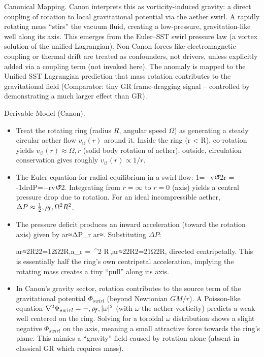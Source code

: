 \documentclass[11pt]{article}
\begin{document}
Canonical Mapping. Canon interprets this as vorticity-induced gravity: a direct coupling of rotation to local gravitational potential via the aether swirl. A rapidly rotating mass “stirs” the vacuum fluid, creating a low-pressure, gravitation-like well along its axis. This emerges from the Euler–SST swirl pressure law (a vortex solution of the unified Lagrangian). Non-Canon forces like electromagnetic coupling or thermal drift are treated as confounders, not drivers, unless explicitly added via a coupling term (not invoked here). The anomaly is mapped to the Unified SST Lagrangian prediction that mass rotation contributes to the gravitational field (Comparator: tiny GR frame-dragging signal – controlled by demonstrating a much larger effect than GR).


Derivable Model (Canon).


\begin{itemize}

\item 
Treat the rotating ring (radius $R$, angular speed $\Omega$) as generating a steady circular aether flow $v_{\circlearrowleft}(r)$ around it. Inside the ring (r < R), co-rotation yields $v_{\circlearrowleft}(r)\approx \Omega,r$ (solid body rotation of aether); outside, circulation conservation gives roughly $v_{\circlearrowleft}(r)\propto 1/r$.




\item 
The Euler equation for radial equilibrium in a swirl flow: 1\rhoFdPdr=−v↺2r = -\rhoF1drdP=−rv↺2. Integrating from $r=\infty$ to $r=0$ (axis) yields a central pressure drop due to rotation. For an ideal incompressible aether, $\Delta P \approx \tfrac{1}{2},\rho_{\!f},\Omega^2 R^2$.




\item 
The pressure deficit produces an inward acceleration (toward the rotation axis) given by ar≈ΔP\rhoFRa_{r} \approx {}ar≈. Substituting $\Delta P$:


ar≈2R22\rhoFR=12Ω2R,a_{r} \;\approx\;  \;=\; \,\Omega^2 R\,,ar≈2\rhoFR{}2R2=21Ω2R,
directed centripetally. This is essentially half the ring’s own centripetal acceleration, implying the rotating mass creates a tiny “pull” along its axis.




\item 
In Canon’s gravity sector, rotation contributes to the source term of the gravitational potential $\Phi_{swirl}$ (beyond Newtonian $GM/r$). A Poisson-like equation $\nabla^2 \Phi_{swirl} = -,\rho_{\!f},|\omega|^2$ (with $\omega$ the aether vorticity) predicts a weak well centered on the ring. Solving for a toroidal $\omega$ distribution shows a slight negative $\Phi_{swirl}$ on the axis, meaning a small attractive force towards the ring’s plane. This mimics a “gravity” field caused by rotation alone (absent in classical GR which requires mass).




\end{itemize}
\end{document}
